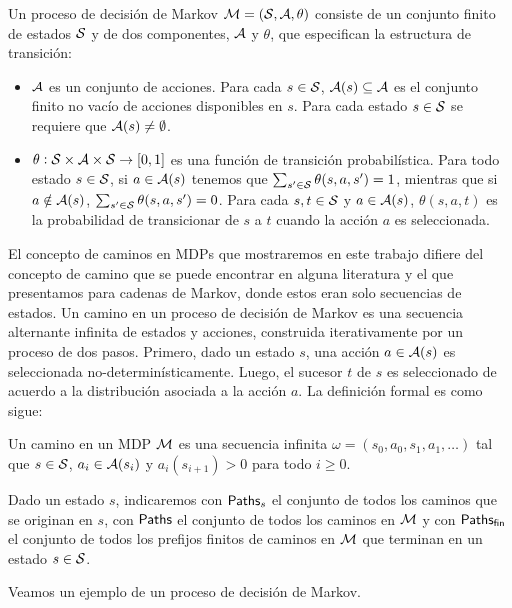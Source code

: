 \begin{definition}
	Un proceso de decisión de Markov $\mathcal{M} =(\mathcal{S}, \mathcal{A}, \theta)$ consiste de un conjunto finito de estados $\mathcal{S}$ y de dos componentes, $\mathcal{A}$ y $\theta$, que especifican la estructura de transición:
	\begin{itemize}
		\item $\mathcal{A}$ es un conjunto de acciones. Para cada $s \in \mathcal{S}$, $\mathcal{A}(s) \subseteq \mathcal{A}$ es el conjunto finito no vacío de
		      acciones disponibles en $s$. Para cada estado $s \in \mathcal{S}$ se requiere que $\mathcal{A}(s) \neq \emptyset$.
		\item $\theta : \mathcal{S} \times \mathcal{A} \times \mathcal{S} \rightarrow [0,1]$ es una función de transición probabilística. Para todo estado $s \in \mathcal{S}$, si $a \in \mathcal{A}(s)$ tenemos que $\sum_{s' \in \mathcal{S}} \theta(s, a, s') = 1$, mientras que si $a \notin \mathcal{A}(s)$, $\sum_{s' \in \mathcal{S}} \theta(s, a, s') = 0$. Para cada $s, t \in \mathcal{S}$ y $a \in \mathcal{A}(s)$, $\theta(s, a, t)$ es la probabilidad de transicionar de $s$ a $t$ cuando la acción $a$ es seleccionada.
	\end{itemize}
\end{definition}

El concepto de caminos en MDPs que mostraremos en este trabajo difiere del
concepto de camino que se puede encontrar en alguna literatura y el que
presentamos para cadenas de Markov, donde estos eran solo secuencias de
estados. Un camino en un proceso de decisión de Markov es una secuencia
alternante infinita de estados y acciones, construida iterativamente por un
proceso de dos pasos. Primero, dado un estado $s$, una acción $a \in \mathcal{A}(s)$
es seleccionada no-determinísticamente. Luego, el sucesor $t$ de $s$ es
seleccionado de acuerdo a la distribución asociada a la acción $a$. La
definición formal es como sigue:

\begin{definition}
	Un camino en un MDP $\mathcal{M}$ es una secuencia infinita $\omega = (s_0, a_0, s_1, a_1, \dots)$ tal que $s \in \mathcal{S}$, $a_i \in \mathcal{A}(s_i)$ y $a_i(s_{i+1}) > 0$ para todo $i \geq 0$.

	Dado un estado $s$, indicaremos con $\textsf{Paths}_s$ el conjunto de todos los caminos
	que se originan en $s$, con $\textsf{Paths}$ el conjunto de todos los caminos en $\mathcal{M}$ y
	con $\textsf{Paths}_\textsf{fin}$ el conjunto de todos los prefijos finitos de caminos en $\mathcal{M}$
	que terminan en un estado $s \in \mathcal{S}$.
\end{definition}

Veamos un ejemplo de un proceso de decisión de Markov.

